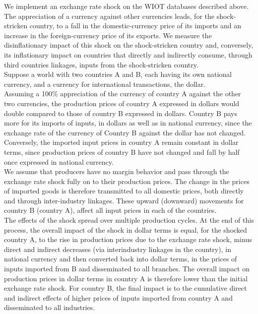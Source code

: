 \documentclass[11pt,a4paper]{article}
\begin{document}
We implement an exchange rate shock on the WIOT databases described above. 
The appreciation of a currency against other currencies leads, for the shock-stricken country, to a fall in the domestic-currency price of its imports and an increase in the foreign-currency price of its exports. We measure the disinflationary impact of this shock on the shock-stricken country and, conversely, its inflationary impact on countries that directly and indirectly consume, through third countries linkages, inputs from the shock-stricken country.\\
Suppose a world with two countries A and B, each having its own national currency, and a currency for international transactions, the dollar. \\
Assuming a 100$\%$ appreciation of the currency of country A against the other two currencies, the production prices of country A expressed in dollars would double compared to those of country B expressed in dollars. Country B pays more for its imports of inputs, in dollars as well as in national currency, since the exchange rate of the currency of Country B against the dollar has not changed. Conversely, the imported input prices in country A remain constant in dollar terms, since production prices of country B have not changed and fall by half once expressed in national currency.\\
We assume that producers have no margin behavior and pass through the exchange rate shock fully on to their production prices. The change in the prices of imported goods is therefore transmitted to all domestic prices, both directly and through inter-industry linkages. These upward (downward) movements for country B (country A), affect all input prices in each of the countries.\\
The effects of the shock spread over multiple production cycles. At the end of this process, the overall impact of the shock in dollar terms is equal, for the shocked country A, to the rise in production prices due to the exchange rate shock, minus direct and indirect decreases (via interindustry linkages in the country), in national currency and then converted back into dollar terms, in the prices of inputs imported from B and disseminated to all branches. The overall impact on production prices in dollar terms in country A is therefore lower than the initial exchange rate shock. For country B, the final impact is to the cumulative direct and indirect effects of higher prices of inputs imported from country A and disseminated to all industries.\\
\end{document}
